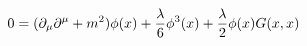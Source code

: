 \begin{equation}
\label{dieci}
0= (\partial_{\mu} \partial^{\mu} + m^2) {\phi (x)} + {\lambda \over 6} \phi^3 (x) + {\lambda \over 2} \phi (x) G(x,x)
\end{equation}

